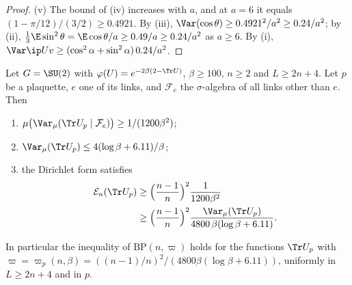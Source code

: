 \begin{proof}
(v) The bound of (iv) increases with $a$, and at $a=6$ it equals
$(1-\pi/12)/(3/2)\ge0.4921$. By (iii), $\Var(\cos\theta)\ge0.4921^2/a^2\ge
0.24/a^2$; by (ii), $\frac13\E\sin^2\theta=\E\cos\theta/a\ge0.49/a\ge0.24/
a^2$ as $a\ge6$. By (i), $\Var\ip Uv\ge(\cos^2\alpha+\sin^2\alpha)\,0.24/
a^2$.
\end{proof}

\begin{proposition}\label{rD:plaquette}
Let $G=\SU(2)$ with $\varphi(U)=e^{-2\beta(2-\Tr U)}$, $\beta\ge100$, $n\ge
2$ and $L\ge2n+4$. Let $p$ be a plaquette, $e$ one of its links, and
$\mathcal F_e$ the $\sigma$-algebra of all links other than $e$. Then
\begin{enumerate}[label=\textup{(\roman*)},leftmargin=*]
\item $\mu\bigl(\Var_\mu(\Tr U_p\mid\mathcal F_e)\bigr)\ge1/(1200\beta^2)$;
\item $\Var_\mu(\Tr U_p)\le4(\log\beta+6.11)/\beta$;
\item the Dirichlet form satisfies
\[
\begin{split}
\mathcal E_n(\Tr U_p)&\ge\Bigl(\frac{n-1}n\Bigr)^2\frac1{1200\beta^2}\\
&\ge\Bigl(\frac{n-1}n\Bigr)^2\frac{\Var_\mu(\Tr U_p)}{4800\,\beta(\log
\beta+6.11)}.
\end{split}
\]
\end{enumerate}
In particular the inequality of $\mathrm{BP}(n,\varpi)$ holds for the
functions $\Tr U_p$ with $\varpi=\varpi_p(n,\beta)=((n-1)/n)^2/(4800\beta
(\log\beta+6.11))$, uniformly in $L\ge2n+4$ and in $p$.
\end{proposition}

